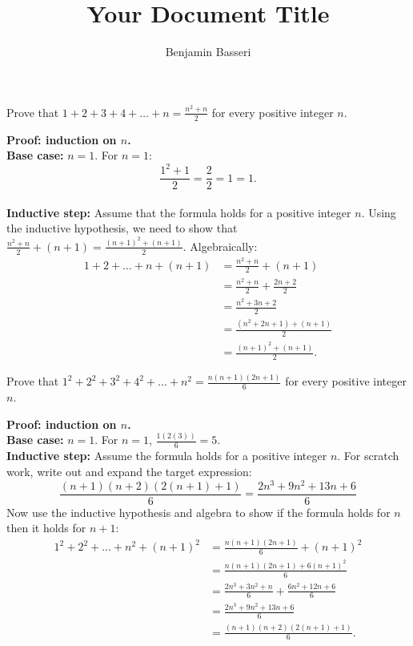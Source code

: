 \documentclass{article}
\title{Your Document Title}
\author{Benjamin Basseri}
\begin{document}
\maketitle

\begin{problem}
Prove that $1 + 2 + 3 + 4 + \ldots + n = \frac{n^2 + n}{2}$ for every positive integer $n$.
\end{problem}

\textbf{Proof: induction on $n$.}
\\
\textbf{Base case:} $n = 1$. For $n = 1$:
$$\frac{1^2 + 1}{2} = \frac{2}{2} = 1 = 1.$$
\\

\textbf{Inductive step:} Assume that the formula holds for a positive integer $n$. Using the inductive hypothesis, we need to show that $\frac{n^2 + n}{2} + (n + 1) = \frac{(n + 1)^2 + (n + 1)}{2}$. Algebraically:
\begin{align*}
  1 + 2 + \ldots + n + (n + 1) & = \frac{n^2 + n}{2} + (n + 1)          \\
                               & = \frac{n^2 + n}{2} + \frac{2n + 2}{2} \\
                               & = \frac{n^2 + 3n + 2}{2}               \\
                               & = \frac{(n^2 + 2n + 1) + (n + 1)}{2}   \\
                               & = \frac{(n + 1)^2 + (n + 1)}{2}.
\end{align*}

\begin{problem}
Prove that $1^2 + 2^2 + 3^2 + 4^2 + \ldots + n^2 = \frac{n(n + 1)(2n + 1)}{6}$ for every positive integer $n$.
\end{problem}

\textbf{Proof: induction on $n$.}
\\

\textbf{Base case:} $n = 1$. For $n = 1$, $\frac{1(2(3))}{6} = 5$.
\\

\textbf{Inductive step:} Assume the formula holds for a positive integer $n$. For scratch work, write out and expand the target expression:
$$\frac{(n+1)(n+2)(2(n+1)+1)}{6} = \frac{2n^3 + 9n^2 + 13n + 6}{6}$$
Now use the inductive hypothesis and algebra to show if the formula holds for $n$ then it holds for $n+1$:
\begin{align*}
  1^2 + 2^2 + \ldots + n^2 + (n + 1)^2 & = \frac{n(n + 1)(2n + 1)}{6} + (n + 1)^2               \\
                                       & = \frac{n(n + 1)(2n + 1) + 6(n + 1)^2}{6}              \\
                                       & = \frac{2n^3 + 3n^2 + n}{6} + \frac{6n^2 + 12n + 6}{6} \\
                                       & = \frac{2n^3 + 9n^2 + 13n + 6}{6}                      \\
                                       & = \frac{(n + 1)(n + 2)(2(n + 1) + 1)}{6}.
\end{align*}
\end{document}
